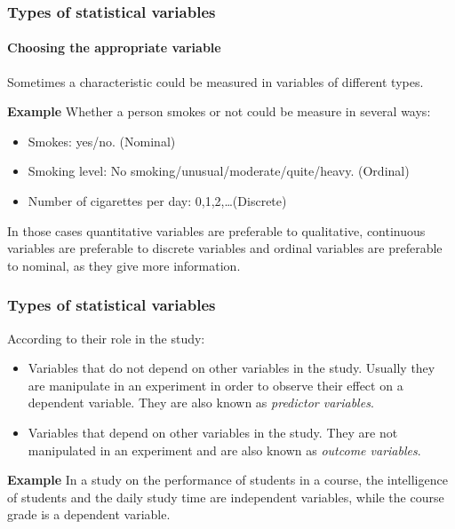 \begin{frame}
\frametitle{Types of statistical variables}
\framesubtitle{Choosing the appropriate variable}
Sometimes a characteristic could be measured in variables of different types. 

\textbf{Example} Whether a person smokes or not could be measure in several ways: 
\begin{itemize}
\item Smokes: yes/no. (Nominal) 
\item Smoking level: No smoking/unusual/moderate/quite/heavy. (Ordinal)
\item Number of cigarettes per day: 0,1,2,\ldots (Discrete) 
\end{itemize} 

In those cases quantitative variables are preferable to qualitative, continuous variables are preferable to discrete
variables and ordinal variables are preferable to nominal, as they give more information. 

\begin{center}
\scalebox{1}{} 
\end{center}
\end{frame}


\begin{frame}
\frametitle{Types of statistical variables}
According to their role in the study:
\begin{itemize}
\item {} Variables that do not depend on other variables in the study. 
Usually they are manipulate in an experiment in order to observe their effect on a dependent variable.
They are also known as \emph{predictor variables}. 
\item {} Variables that depend on other variables in the study.
They are not manipulated in an experiment and are also known as \emph{outcome variables}. 
\end{itemize}

\textbf{Example} In a study on the performance of students in a course, the intelligence of students and the daily
study time are independent variables, while the course grade is a dependent variable. 
\end{frame}


